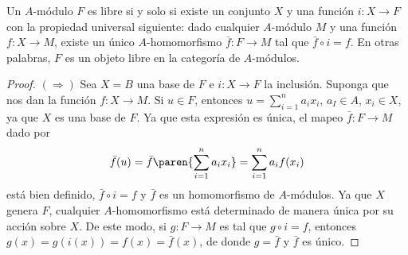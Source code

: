 \begin{proposition}\label{prop:1.7.9}%
  Un $A$-módulo $F$ es libre si y solo si existe un conjunto $X$ y una función $i\colon X\to F$ con la propiedad universal siguiente: dado cualquier $A$-módulo $M$ y una función $f\colon X \to M$, existe un único $A$-homomorfismo $\bar f \colon F \to M$ tal que $\bar f \circ i = f$. En otras palabras, $F$ es un objeto libre en la categoría de $A$-módulos.
\end{proposition}
\begin{proof}
  $(\Rightarrow)$ Sea $X = B$ una base de $F$ e $i\colon X \to F$ la inclusión. Suponga que nos dan la función $f \colon X \to M$. Si $u\in F$, entonces $u = \sum_{i=1}^n a_ix_i$, $a_I \in A$, $x_i \in X$, ya que $X$ es una base de $F$. Ya que esta expresión es única, el mapeo $\bar f \colon F \to M$ dado por
  \[
    \bar f (u) = \bar f \paren{\sum_{i=1}^n a_ix_i} = \sum_{i=1}^n a_if(x_i)
  \]
  está bien definido, $\bar f \circ i = f$ y $\bar f$ es un homomorfismo de $A$-módulos. Ya que $X$ genera $F$, cualquier $A$-homomorfismo está determinado de manera única por su acción sobre $X$. De este modo, si $g \colon F \to M$ es tal que $g\circ i = f$, entonces $g(x) = g(i(x)) = f(x) = \bar f(x)$, de donde $g = \bar f$ y $\bar f$ es único.


\end{proof}
